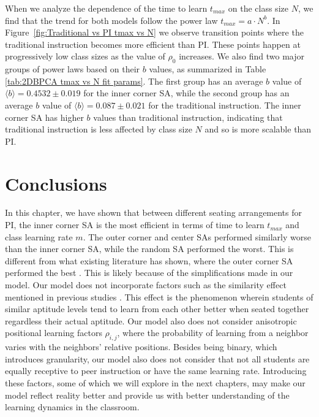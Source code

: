 When we analyze the dependence of the time to learn $t_{max}$ on the class size $N$, we find that the trend for both models follow the power law $t_{max} = a \cdot N^b$. 
In Figure~\ref{fig:Traditional vs PI tmax vs N} we observe transition points where the traditional instruction becomes more efficient than PI. 
These points happen at progressively low class sizes as the value of $\rho_0$ increases. 
We also find two major groups of power laws based on their $b$ values, as summarized in Table \ref{tab:2DBPCA tmax vs N fit params}. 
The first group has an average $b$ value of $\langle b \rangle = 0.4532 \pm 0.019$ for the inner corner SA, while the second group has an average $b$ value of $\langle b \rangle = 0.087\pm0.021$ for the traditional instruction. 
The inner corner SA has higher $b$ values than traditional instruction, indicating that traditional instruction is less affected by class size $N$ and so is more scalable than PI.

\section{Conclusions}
In this chapter, we have shown that between different seating arrangements for PI, the inner corner SA is the most efficient in terms of time to learn $t_{max}$ and class learning rate $m$. 
The outer corner and center SAs performed similarly worse than the inner corner SA, while the random SA performed the worst. 
This is different from what existing literature has shown, where the outer corner SA performed the best \cite{roxas2010seating}. 
This is likely because of the simplifications made in our model. 
Our model does not incorporate factors such as the similarity effect mentioned in previous studies \cite{roxas2010seating,smith2009peer}. 
This effect is the phenomenon wherein students of similar aptitude levels tend to learn from each other better when seated together regardless their actual aptitude. 
Our model also does not consider anisotropic positional learning factors $\rho_{i,j}$, where the probability of learning from a neighbor varies with the neighbors' relative positions. 
Besides being binary, which introduces granularity, our model also does not consider that not all students are equally receptive to peer instruction or have the same learning rate. 
Introducing these factors, some of which we will explore in the next chapters, may make our model reflect reality better and provide us with better understanding of the learning dynamics in the classroom.


